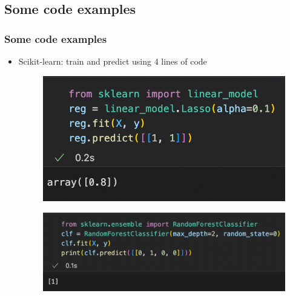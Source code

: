 \subsection{Some code examples}

\begin{frame}\frametitle{Some code examples}
   \begin{itemize}
      \item Scikit-learn: train and predict using 4 lines of code

      \vspace{.3cm}
      \begin{figure}[H]
         \hspace*{-6cm}
         \includegraphics[scale=.4]{../images/illustrations/model_code_linear_regression.png}
      \end{figure}

      \begin{figure}[H]
         \hspace*{-3.76cm} 
         \includegraphics[scale=.4]{../images/illustrations/model_code_random_forest.png}
      \end{figure}
      
   \end{itemize}
\end{frame}


